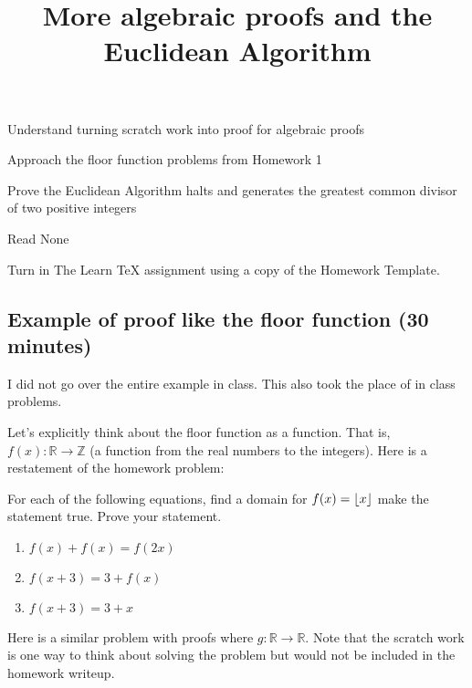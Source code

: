 \documentclass{../ximera}
\title{More algebraic proofs and the Euclidean Algorithm}
\begin{document}
\begin{abstract}
\end{abstract}
\maketitle


\begin{obj}
\item  Understand turning scratch work into proof for algebraic proofs
\item  Approach the floor function problems from Homework 1
\item Prove the Euclidean Algorithm halts and generates the greatest common divisor of two positive integers
\end{obj}

\begin{pre}
 \item[Read] None 
 \item[Turn in] The Learn TeX assignment using a copy of the Homework Template.
\end{pre}
\subsection{Example of proof like the floor function (30 minutes)}
I did not go over the entire example in class. This also took the place of in class problems.

Let's explicitly think about the floor function as a function. That is, $f(x):\mathbb{R}\to\mathbb{Z}$ (a function from the real numbers to the integers). Here is a restatement of the homework problem:

\begin{prob}
For each of the following equations, find a domain for $f(x)=\left\lfloor  x \right\rfloor$ make the statement true. Prove your statement. 
	\begin{enumerate}
 		\item $f( x ) + f( x ) =f( 2x)$
		\item $f( x + 3 )  = 3 +f( x)$
		\item $f( x +3 ) = 	3 + x$
	\end{enumerate} 
\end{prob}

Here is a similar problem with proofs where $g:\mathbb{R}\to\mathbb{R}$. Note that the scratch work is one way to think about solving the problem but would not be included in the homework writeup.
\end{document}
